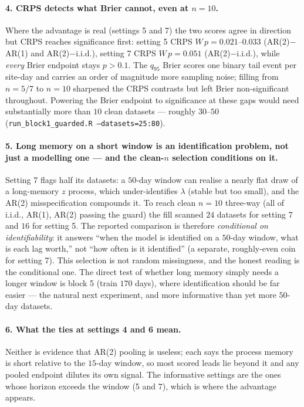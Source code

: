 \documentclass[11pt]{article}
\newcommand{\code}[1]{\texttt{#1}}
\begin{document}
\paragraph{4. CRPS detects what Brier cannot, even at $n = 10$.} Where the
advantage is real (settings 5 and 7) the two scores agree in direction but
CRPS reaches significance first: setting 5 CRPS $W\,p = 0.021$--$0.033$
(AR(2)$-$AR(1) and AR(2)$-$i.i.d.), setting 7 CRPS $W\,p = 0.051$
(AR(2)$-$i.i.d.), while \emph{every} Brier endpoint stays $p > 0.1$. The
$q_{95}$ Brier scores one binary tail event per site-day and carries an order
of magnitude more sampling noise; filling from $n = 5/7$ to $n = 10$ sharpened
the CRPS contrasts but left Brier non-significant throughout. Powering the
Brier endpoint to significance at these gaps would need substantially more
than $10$ clean datasets --- roughly $30$--$50$
(\code{run\_block1\_guarded.R --datasets=25:80}).

\paragraph{5. Long memory on a short window is an identification problem, not
just a modelling one --- and the clean-$n$ selection conditions on it.}
Setting 7 flags half its datasets: a $50$-day window can realise a nearly flat
draw of a long-memory $z$ process, which under-identifies $\lambda$ (stable
but too small), and the AR(2) misspecification compounds it. To reach clean
$n = 10$ three-way (all of i.i.d., AR(1), AR(2) passing the guard) the fill
scanned $24$ datasets for setting 7 and $16$ for setting 5. The reported
comparison is therefore \emph{conditional on identifiability}: it answers
``when the model is identified on a $50$-day window, what is each lag worth,''
not ``how often is it identified'' (a separate, roughly-even coin for
setting 7). This selection is not random missingness, and the honest reading
is the conditional one. The direct test of whether long memory simply needs a
longer window is block 5 (train $170$ days), where identification should be
far easier --- the natural next experiment, and more informative than yet more
$50$-day datasets.

\paragraph{6. What the ties at settings 4 and 6 mean.} Neither is evidence
that AR(2) pooling is useless; each says the process memory is short relative
to the $15$-day window, so most scored leads lie beyond it and any pooled
endpoint dilutes its own signal. The informative settings are the ones whose
horizon exceeds the window (5 and 7), which is where the advantage appears.
\end{document}

